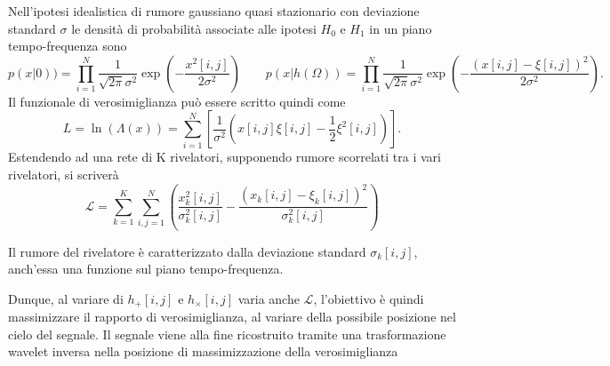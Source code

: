 Nell'ipotesi idealistica di rumore gaussiano quasi stazionario con deviazione standard $\sigma$ le densità di probabilità associate alle ipotesi $H_0$ e $H_1$ in un piano tempo-frequenza sono 
\begin{equation}
	p(x|0)) = \prod_{i=1}^N\frac{1}{\sqrt{2\pi}\sigma^2}\exp(-\frac{x^2[i,j]}{2\sigma^2})
	\quad\quad
	p(x|h(\Omega)) = \prod_{i=1}^N\frac{1}{\sqrt{2\pi}\sigma^2}\exp(-\frac{(x[i,j]-\xi[i,j])^2}{2\sigma^2}).
\end{equation}
Il funzionale di verosimiglianza può essere scritto quindi come
\begin{equation}
	L = \ln(\Lambda(x)) = \sum_{i=1}^{N}\left[\frac{1}{\sigma^2}\left(x[i,j]\xi[i,j]-\frac{1}{2}\xi^2[i,j]\right)\right].
\end{equation}
Estendendo ad una rete di K rivelatori, supponendo rumore scorrelati tra i vari rivelatori, si scriverà
\begin{equation}
	\mathcal{L} = \sum_{k=1}^{K}\sum_{i,j=1}^{N}\left(\frac{x_k^2[i,j]}{\sigma_k^2[i,j]} - \frac{(x_k[i,j]-\xi_k[i,j])^2}{\sigma_k^2[i,j]}  \right)
	\label{eqn:Likelihood}
\end{equation}

Il rumore del rivelatore è caratterizzato dalla deviazione standard $\sigma_k[i,j]$,  anch'essa una funzione sul piano tempo-frequenza. 

Dunque, al variare di $h_{+}[i,j]$ e $h_{\times}[i,j]$ varia anche $\mathcal{L}$, l'obiettivo è quindi massimizzare il rapporto di verosimiglianza, al variare della possibile posizione nel cielo del segnale. Il segnale viene alla fine ricostruito tramite una trasformazione wavelet inversa nella posizione di massimizzazione della verosimiglianza

